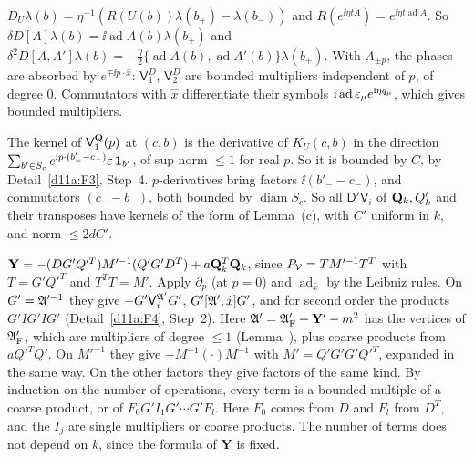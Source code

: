 \begin{detail}\label{d11a:F14}
\begin{step}
$D_U\lambda(b)=\eta^{-1}(R(U(b))\lambda(b_+)-\lambda(b_-))$ and $R(e^{\ii\eta tA})=e^{\ii\eta t\operatorname{ad}A}$. So $\delta D[A]\lambda(b)=\ii\operatorname{ad}A(b)\lambda(b_+)$ and $\delta^2D[A,A']\lambda(b)=-\frac\eta2\{\operatorname{ad}A(b),\operatorname{ad}A'(b)\}\lambda(b_+)$. With $A_{\pm p}$, the phases are absorbed by $e^{\mp\ii p\cdot\hat x}$: $\mathsf V^D_1$, $\mathsf V^D_2$ are bounded multipliers independent of $p$, of degree $0$. Commutators with $\hat x$ differentiate their symbols $\mathrm i\operatorname{ad}\varepsilon_\mu e^{\mathrm i\eta q_\mu}$, which gives bounded multipliers.
\end{step}
\begin{step}
The kernel of $\mathsf V_1^{\mathbf Q}(p)$ at $(c,b)$ is the derivative of $K_U(c,b)$ in the direction $\sum_{b'\in S_c}e^{\mathrm i p\cdot(b'_--c_-)}\varepsilon\,\mathbf 1_{b'}$, of sup norm $\le1$ for real $p$. So it is bounded by $C$, by Detail~\ref{d11a:F3}, Step~4. $p$-derivatives bring factors $\ii(b'_--c_-)$, and commutators $(c_--b_-)$, both bounded by $\operatorname{diam}S_c$. So all $\mathsf D'\mathsf V_i$ of $\mathbf Q_k,Q'_k$ and their transposes have kernels of the form of Lemma~(c), with $C'$ uniform in $k$, and norm $\le2dC'$.
\end{step}
\begin{step}
$\mathbf Y=-(DG'Q'^T)M'^{-1}(Q'G'D^T)+a\mathbf Q_k^T\mathbf Q_k$, since $P_\mathcal V=TM'^{-1}T^T$ with $T=G'Q'^T$ and $T^TT=M'$. Apply $\partial_p$ (at $p=0$) and $\operatorname{ad}_{\hat x}$ by the Leibniz rules. On $G'=\mathfrak A'^{-1}$ they give $-G'\mathsf V^{\mathfrak A'}_iG'$, $G'[\mathfrak A',\hat x]G'$, and for second order the products $G'IG'IG'$ (Detail~\ref{d11a:F4}, Step~2). Here $\mathfrak A'=\mathfrak A'_{\rm F}+\mathbf Y'-m^2$ has the vertices of $\mathfrak A'_{\rm F}$, which are multipliers of degree $\le1$ (Lemma~), plus coarse products from $aQ'^TQ'$. On $M'^{-1}$ they give $-M^{-1}(\cdot)M^{-1}$ with $M'=Q'G'G'Q'^T$, expanded in the same way. On the other factors they give factors of the same kind. By induction on the number of operations, every term is a bounded multiple of a coarse product, or of $F_0G'I_1G'\cdots G'F_l$. Here $F_0$ comes from $D$ and $F_l$ from $D^T$, and the $I_j$ are single multipliers or coarse products. The number of terms does not depend on $k$, since the formula of $\mathbf Y$ is fixed.

\end{step}
\end{detail}
